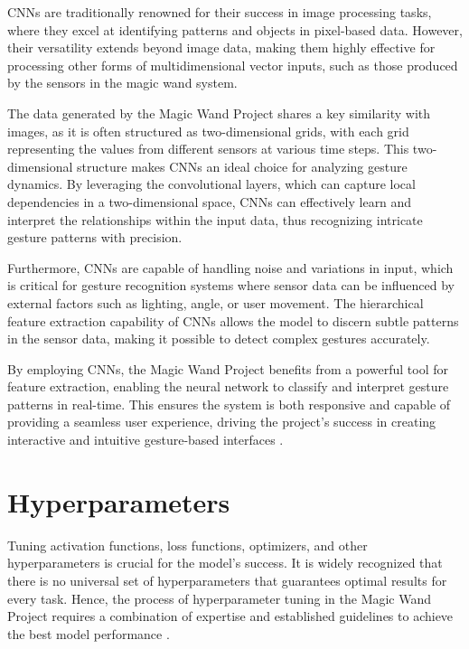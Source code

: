 CNNs are traditionally renowned for their success in image processing tasks, where they excel at identifying patterns and objects in pixel-based data. However, their versatility extends beyond image data, making them highly effective for processing other forms of multidimensional vector inputs, such as those produced by the sensors in the magic wand system.

The data generated by the Magic Wand Project shares a key similarity with images, as it is often structured as two-dimensional grids, with each grid representing the values from different sensors at various time steps. This two-dimensional structure makes CNNs an ideal choice for analyzing gesture dynamics. By leveraging the convolutional layers, which can capture local dependencies in a two-dimensional space, CNNs can effectively learn and interpret the relationships within the input data, thus recognizing intricate gesture patterns with precision.

Furthermore, CNNs are capable of handling noise and variations in input, which is critical for gesture recognition systems where sensor data can be influenced by external factors such as lighting, angle, or user movement. The hierarchical feature extraction capability of CNNs allows the model to discern subtle patterns in the sensor data, making it possible to detect complex gestures accurately.

By employing CNNs, the Magic Wand Project benefits from a powerful tool for feature extraction, enabling the neural network to classify and interpret gesture patterns in real-time. This ensures the system is both responsive and capable of providing a seamless user experience, driving the project’s success in creating interactive and intuitive gesture-based interfaces \cite{Xu:2022}.


\section{Hyperparameters}

Tuning activation functions, loss functions, optimizers, and other hyperparameters is crucial for the model's success. It is widely recognized that there is no universal set of hyperparameters that guarantees optimal results for every task. Hence, the process of hyperparameter tuning in the Magic Wand Project requires a combination of expertise and established guidelines to achieve the best model performance \cite{Li:2021}.

